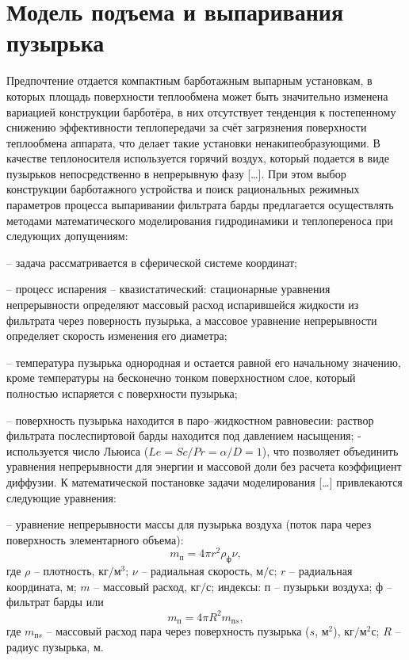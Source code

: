 \section{Модель подъема и выпаривания пузырька}

Предпочтение отдается компактным барботажным выпарным установкам, в которых площадь поверхности теплообмена может быть значительно изменена вариацией конструкции барботёра, в них отсутствует тенденция к постепенному снижению эффективности теплопередачи за счёт загрязнения поверхности теплообмена аппарата, что делает такие установки ненакипеобразующими.
В качестве теплоносителя используется горячий воздух, который подается в виде пузырьков непосредственно в непрерывную фазу [\ldots]. При этом выбор конструкции барботажного устройства и поиск рациональных режимных параметров процесса выпаривании фильтрата барды предлагается осуществлять
методами математического моделирования гидродинамики и теплопереноса при следующих допущениям:

-- задача рассматривается в сферической системе координат;

-- процесс испарения -- квазистатический: стационарные уравнения непрерывности определяют массовый расход испарившейся жидкости из фильтрата через поверность пузырька, а массовое уравнение непрерывности определяет скорость изменения его диаметра;

-- температура пузырька однородная и остается равной его начальному значению, кроме температуры на бесконечно тонком поверхностном слое, который полностью испаряется с поверхности пузырька;

-- поверхность пузырька находится в паро--жидкостном равновесии: раствор фильтрата послеспиртовой барды находится под давлением насыщения;
- используется число Льюиса ($Le{ =}{Sc}/{Pr}{ =}{\alpha }/{D}{ =1}$), что позволяет объединить уравнения непрерывности для энергии и массовой доли без расчета коэффициент диффузии.
К математической постановке задачи моделирования [\ldots] привлекаются следующие уравнения:

-- уравнение непрерывности массы для пузырька воздуха (поток пара через поверхность элементарного объема):
\begin{equation} \label{l1} 
m_{{ п}}{ =4}\pi r^{{ 2}}{\rho }_{{ ф}}\nu ,  
\end{equation} 
где $\rho $ -- плотность, ${{ кг}}/{{{ м}}^{{ 3}}}$; $\nu $ -- радиальная скорость, ${{ м}}/{{ с}}$; $r$ -- радиальная координата, ${ м}$; $m$ -- массовый расход, ${{ кг}}/{{ с}}$; индексы: ${ п}$ -- пузырьки воздуха; ${ ф}$ -- фильтрат барды
или
\begin{equation} \label{l2} 
m_{{ п}}{ =4}\pi R^{{ 2}}m_{{ п}s},  
\end{equation} 
где $m_{{ пs}}$ -- массовый расход пара через поверхность пузырька ($s$, ${{ м}}^{{ 2}}$), ${{ кг}}/{{{ м}}^{{ 2}}{ с}}$; $R$ -- радиус пузырька, ${ м}$.

